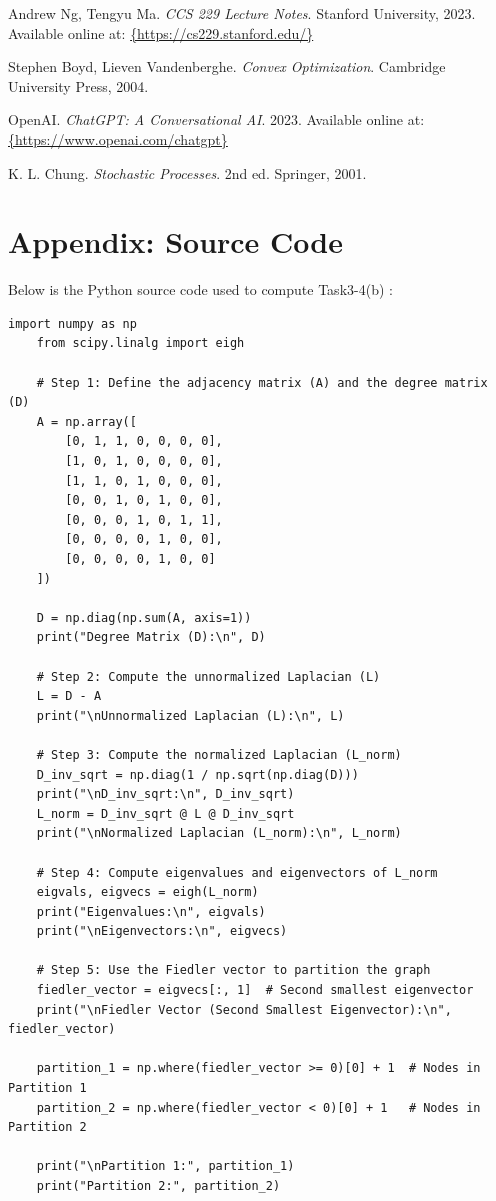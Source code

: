 \documentclass[12pt]{article}
\begin{document}
\newpage
\begin{thebibliography}{99}

    Andrew Ng, Tengyu Ma. \textit{CCS 229 Lecture Notes}. Stanford University, 2023. Available online at: \url{{https://cs229.stanford.edu/}}
    
    Stephen Boyd, Lieven Vandenberghe. \textit{Convex Optimization}. Cambridge University Press, 2004.
    
    OpenAI. \textit{ChatGPT: A Conversational AI}. 2023. Available online at: \url{{https://www.openai.com/chatgpt}}
    
    K. L. Chung. \textit{Stochastic Processes}. 2nd ed. Springer, 2001.

\end{thebibliography}

\newpage
\appendix
\section*{Appendix: Source Code}

Below is the Python source code used to compute Task3-4(b) :

\begin{lstlisting}[caption=Python Source Code for Spectral Clustering]
    import numpy as np
    from scipy.linalg import eigh
    
    # Step 1: Define the adjacency matrix (A) and the degree matrix (D)
    A = np.array([
        [0, 1, 1, 0, 0, 0, 0],
        [1, 0, 1, 0, 0, 0, 0],
        [1, 1, 0, 1, 0, 0, 0],
        [0, 0, 1, 0, 1, 0, 0],
        [0, 0, 0, 1, 0, 1, 1],
        [0, 0, 0, 0, 1, 0, 0],
        [0, 0, 0, 0, 1, 0, 0]
    ])
    
    D = np.diag(np.sum(A, axis=1))
    print("Degree Matrix (D):\n", D)

    # Step 2: Compute the unnormalized Laplacian (L)
    L = D - A
    print("\nUnnormalized Laplacian (L):\n", L)

    # Step 3: Compute the normalized Laplacian (L_norm)
    D_inv_sqrt = np.diag(1 / np.sqrt(np.diag(D)))
    print("\nD_inv_sqrt:\n", D_inv_sqrt)
    L_norm = D_inv_sqrt @ L @ D_inv_sqrt
    print("\nNormalized Laplacian (L_norm):\n", L_norm)

    # Step 4: Compute eigenvalues and eigenvectors of L_norm
    eigvals, eigvecs = eigh(L_norm)
    print("Eigenvalues:\n", eigvals)
    print("\nEigenvectors:\n", eigvecs)

    # Step 5: Use the Fiedler vector to partition the graph
    fiedler_vector = eigvecs[:, 1]  # Second smallest eigenvector
    print("\nFiedler Vector (Second Smallest Eigenvector):\n", fiedler_vector)

    partition_1 = np.where(fiedler_vector >= 0)[0] + 1  # Nodes in Partition 1
    partition_2 = np.where(fiedler_vector < 0)[0] + 1   # Nodes in Partition 2

    print("\nPartition 1:", partition_1)
    print("Partition 2:", partition_2)
\end{lstlisting}
\end{document}
